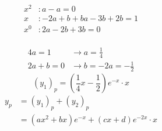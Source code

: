 \documentclass[10pt, letterpaper]{article}
\begin{document}
\\
\begin{align*}
x^2 &: a-a=0\\
x &: -2a+b+ba-3b+2b=1\\
x^0 &: 2a-2b+3b=0
\end{align*}
\\
\begin{align*}
4a=1 &\rightarrow a=\frac{1}{4}\\
2a+b=0 &\rightarrow b=-2a=-\frac{1}{2}
\end{align*}
\begin{equation*}
(y_1)_p = (\frac{1}{4}x-\frac{1}{2})e^{-x}\cdot x
\end{equation*}
\begin{align*}
y_p &= (y_1)_p +(y_2)_p\\
&= (ax^2 +bx)e^{-x} +(cx+d)e^{-2x}\cdot x
\end{align*}
\end{document}
